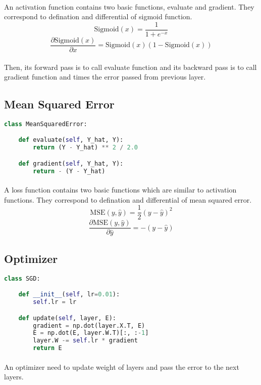 \paragraph{}
An activation function contains two basic functions, evaluate and gradient. They correspond to defination and differential of sigmoid function.
$$\text{Sigmoid}(x) = \frac{1}{1 + e^{-x}}$$
$$\frac{\partial \text{Sigmoid}(x)}{\partial x}=\text{Sigmoid}(x)(1 - \text{Sigmoid}(x))$$
\paragraph{}
Then, its forward pass is to call evaluate function and its backward pass is to call gradient function and times the error passed from previous layer.
\subsection{Mean Squared Error}
\begin{lstlisting}[language=Python]
class MeanSquaredError:

    def evaluate(self, Y_hat, Y):
        return (Y - Y_hat) ** 2 / 2.0

    def gradient(self, Y_hat, Y):
        return - (Y - Y_hat)
\end{lstlisting}
\paragraph{}
A loss function contains two basic functions which are similar to activation functions. They correspond to defination and differential of mean squared error.
$$\text{MSE}(y, \hat{y}) = \frac{1}{2}(y - \hat{y})^2$$
$$\frac{\partial \text{MSE}(y, \hat{y})}{\partial \hat{y}} = -(y - \hat{y})$$
\subsection{Optimizer}
\begin{lstlisting}[language=Python]
class SGD:

    def __init__(self, lr=0.01):
        self.lr = lr

    def update(self, layer, E):
        gradient = np.dot(layer.X.T, E)
        E = np.dot(E, layer.W.T)[:, :-1]
        layer.W -= self.lr * gradient
        return E
\end{lstlisting}
\paragraph{}
An optimizer need to update weight of layers and pass the error to the next layers.
